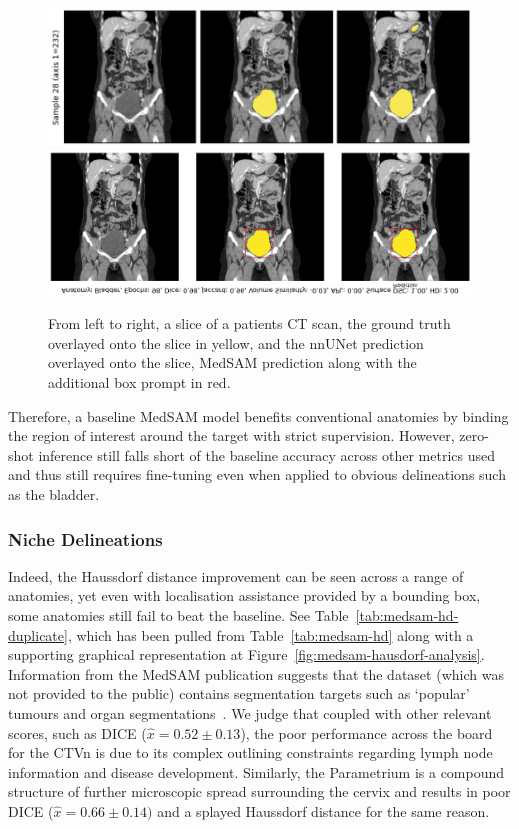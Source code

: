 \documentclass[12pt,twoside]{report}
\begin{document}
\begin{figure}[H]
  \centering
 \includegraphics[width=.7\linewidth]{../figures/bladder-nnunet-innacuracy.png}
  \includegraphics[width=.226\linewidth, trim=1000px 45px 0 0px, clip]{../figures/medsam-bladder-prediction.png}
  \caption{From left to right, a slice of a patients CT scan, the ground truth overlayed onto the slice in yellow, and the nnUNet prediction overlayed onto the slice, MedSAM prediction along with the additional box prompt in red.}\label{fig:bladder-nnunet-innacuracy}
\end{figure}%

Therefore, a baseline MedSAM model benefits conventional anatomies by binding the region of interest around the target with strict supervision. However, zero-shot inference still falls short of the baseline accuracy across other metrics used and thus still requires fine-tuning even when applied to obvious delineations such as the bladder.

\subsubsection{Niche Delineations}

Indeed, the Haussdorf distance improvement can be seen across a range of anatomies, yet even with localisation assistance provided by a bounding box, some anatomies still fail to beat the baseline. See Table~\ref{tab:medsam-hd-duplicate}, which has been pulled from Table~\ref{tab:medsam-hd} along with a supporting graphical representation at Figure~\ref{fig:medsam-hausdorf-analysis}. Information from the MedSAM publication suggests that the dataset (which was not provided to the public) contains segmentation targets such as `popular' tumours and organ segmentations~\cite{Ma2024}. We judge that coupled with other relevant scores, such as DICE ($\hat{x} = 0.52 \pm 0.13$), the poor performance across the board for the CTVn is due to its complex outlining constraints regarding lymph node information and disease development. Similarly, the Parametrium is a compound structure of further microscopic spread surrounding the cervix and results in poor DICE ($\hat{x} = 0.66 \pm 0.14)$ and a splayed Haussdorf distance for the same reason.
\end{document}
